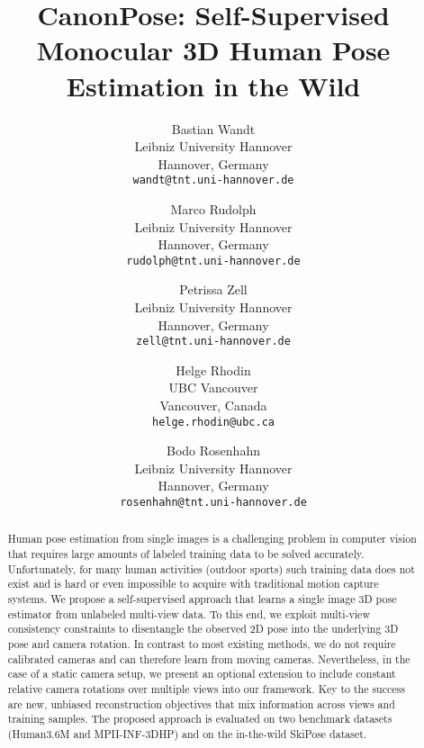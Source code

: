 \documentclass[final]{cvpr}
\begin{document}
\title{CanonPose: Self-Supervised Monocular 3D Human Pose Estimation in the Wild}

\author{Bastian Wandt\\
Leibniz University Hannover\\
Hannover, Germany\\
{\tt\small wandt@tnt.uni-hannover.de}
\and
Marco Rudolph\\
Leibniz University Hannover\\
Hannover, Germany\\
{\tt\small rudolph@tnt.uni-hannover.de}
\and
Petrissa Zell\\
Leibniz University Hannover\\
Hannover, Germany\\
{\tt\small zell@tnt.uni-hannover.de}
\and
Helge Rhodin\\
UBC Vancouver\\
Vancouver, Canada\\
{\tt\small helge.rhodin@ubc.ca}
\and
Bodo Rosenhahn\\
Leibniz University Hannover\\
Hannover, Germany\\
{\tt\small rosenhahn@tnt.uni-hannover.de}
}

\maketitle


\begin{abstract}
Human pose estimation from single images is a challenging problem in computer vision that requires large amounts of labeled training data to be solved accurately.
Unfortunately, for many human activities (\eg outdoor sports) such training data does not exist and is hard or even impossible to acquire with traditional motion capture systems.
We propose a self-supervised approach that learns a single image 3D pose estimator from unlabeled multi-view data.
To this end, we exploit multi-view consistency constraints to disentangle the observed 2D pose into the underlying 3D pose and camera rotation.
In contrast to most existing methods, we do not require calibrated cameras and can therefore learn from moving cameras.
Nevertheless, in the case of a static camera setup, we present an optional extension to include constant relative camera rotations over multiple views into our framework. 
Key to the success are new, unbiased reconstruction objectives that mix information across views and training samples.
The proposed approach is evaluated on two benchmark datasets (Human3.6M and MPII-INF-3DHP) and on the in-the-wild SkiPose dataset.

\end{abstract}
\end{document}
